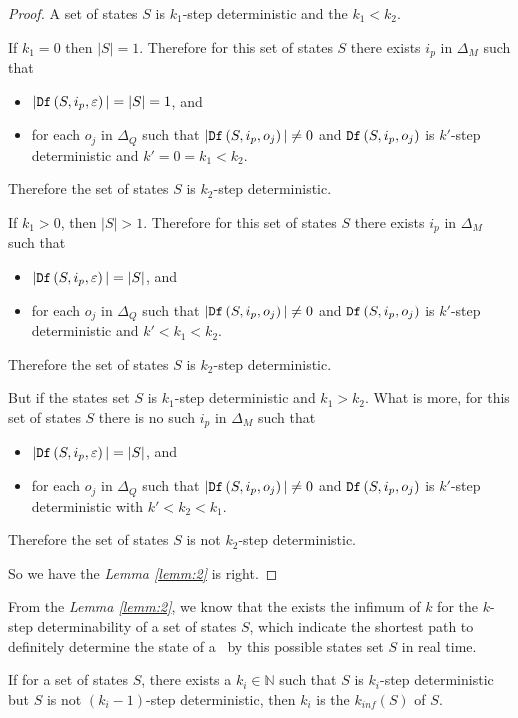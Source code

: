 \begin{proof}
 A set of states $S$ is $k_1$-step deterministic and the $k_1< k_2$. 
 
 If $k_1=0$ then $|S|=1$. Therefore for this set of states $S$ there exists $i_p$ in $\Delta_M$ such that
 \begin{itemize}
 \item  $|{\tt Df}\left(S,i_p,\varepsilon\right)|=|S|=1$, and 
 \item  for each $o_j$ in $\Delta_Q$ such that $|{\tt Df}\left(S,i_p,o_j\right)|\neq 0$ and ${\tt Df}\left(S,i_p,o_j\right)$ is $k'$-step deterministic and ${k'}=0=k_1< k_2$.
 \end{itemize}
 Therefore the set of states $S$ is $k_2$-step deterministic.
 
 If $k_1>0$, then $|S|>1$. Therefore for this set of states $S$ there exists $i_p$ in $\Delta_M$ such that
 \begin{itemize}
 \item  $|{\tt Df}\left(S,i_p,\varepsilon\right)|=|S|$, and 
 \item  for each $o_j$ in $\Delta_Q$ such that $|{\tt Df}\left(S,i_p,o_j\right)|\neq 0$ and ${\tt Df}\left(S,i_p,o_j\right)$ is $k'$-step deterministic and ${k'}<k_1< k_2$.
 \end{itemize}
 Therefore the set of states $S$ is $k_2$-step deterministic.

 But if the states set $S$ is $k_1$-step deterministic and $k_1> k_2$. What is more, for this set of states $S$ there is no such $i_p$ in $\Delta_M$ such that
 \begin{itemize}
 \item  $|{\tt Df}\left(S,i_p,\varepsilon\right)|=|S|$, and 
 \item  for each $o_j$ in $\Delta_Q$ such that $|{\tt Df}\left(S,i_p,o_j\right)|\neq 0$ and ${\tt Df}\left(S,i_p,o_j\right)$ is $k'$-step deterministic with  ${k'}<k_2<k_1$.
 \end{itemize}
 Therefore the set of states $S$ is not $k_2$-step deterministic.
 
 So we have the {\em Lemma \ref{lemm:2}} is right.
\end{proof}
From the {\em Lemma \ref{lemm:2}}, we know that the exists the infimum of $k$ for the $k$-step determinability of a set of states $S$, which indicate the shortest path to definitely determine the state of a \BCN\ by this possible states set $S$ in real time.
\begin{definition}[$k_{inf}(S)$] 
If for a set of states $S$, there exists a $k_i\in \mathbb{N}$ such that $S$ is $k_i$-step deterministic but $S$ is not $(k_{i}-1)$-step deterministic, then $k_{i}$ is the $k_{inf}(S)$ of $S$.
\end{definition}

